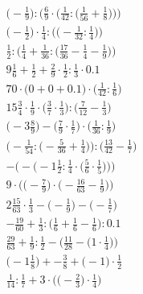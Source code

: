 \documentclass[8pt]{article}
\begin{document}
\begin{align}
\bigg(-\frac{1}{9}\bigg) : \bigg(\frac{6}{9} \cdot \Big(\frac{1}{42} : \big(\frac{1}{56} + \frac{1}{8}\big)\Big)\bigg) \\
\Big(-\frac{1}{2}\Big) \cdot \frac{1}{4} : \Big(\big(-\frac{1}{32} : \frac{1}{4}\big)\Big) \\
\frac{1}{2} : \Big(\frac{1}{4} + \frac{1}{36} : \big(\frac{17}{36} - \frac{1}{4} - \frac{1}{9}\big)\Big) \\
9\frac{1}{6} + \frac{1}{2} + \frac{2}{9} \cdot \frac{1}{2} : \frac{1}{3} \cdot 0.1 \\
70 \cdot \big(0 + 0 + 0.1\big) \cdot \big(\frac{1}{42} : \frac{1}{6}\big) \\
15\frac{3}{4} \cdot \frac{1}{9} \cdot \big(\frac{3}{7} \cdot \frac{1}{3}\big) : \big(\frac{7}{12} - \frac{1}{3}\big) \\
\big(-3\frac{8}{9}\big) - \big(\frac{7}{9} \cdot \frac{1}{7}\big) \cdot \big(\frac{1}{36} : \frac{1}{9}\big) \\
\Big(-\frac{1}{54} : \big(-\frac{5}{36} + \frac{1}{4}\big)\Big) : \Big(\frac{13}{42} - \frac{1}{7}\Big) \\
-\bigg(-\Big(-1\frac{1}{2} : \frac{1}{4} \cdot \big(\frac{5}{6} \cdot \frac{1}{5}\big)\Big)\bigg) \\
9 \cdot \Big(\big(-\frac{7}{9}\big) \cdot \big(-\frac{16}{63} - \frac{1}{9}\big)\Big) \\
2\frac{15}{63} \cdot \frac{1}{3} - \big(-\frac{1}{9}\big) - \big(-\frac{1}{7}\big) \\
-\frac{19}{60} + \frac{1}{3} : \big(\frac{1}{6} + \frac{1}{6} - \frac{1}{6}\big) : 0.1 \\
\frac{29}{63} + \frac{1}{9} : \frac{1}{2} - \Big(\frac{11}{28} - \big(1 \cdot \frac{1}{4}\big)\Big) \\
\big(-1\frac{1}{8}\big) + -\frac{3}{8} + \big(-1\big) \cdot \frac{1}{2} \\
\frac{1}{14} : \frac{1}{7} + 3 \cdot \Big(\big(-\frac{2}{3}\big) \cdot \frac{1}{4}\Big)
\end{align}
\end{document}
